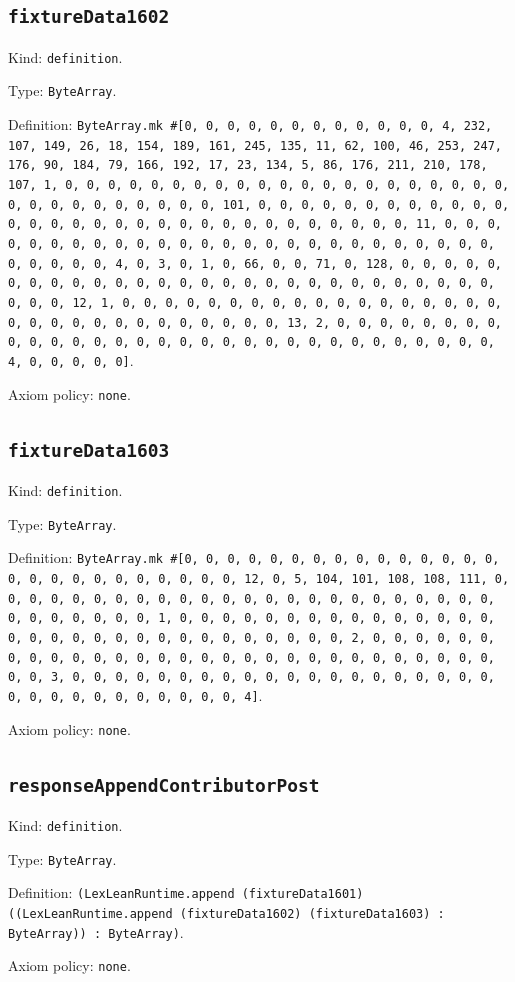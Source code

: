 \documentclass[11pt]{article}
\begin{document}
\subsection*{\texttt{fixtureData1602}}
\noindent Kind: \texttt{definition}.\par
\noindent Type: \texttt{ByteArray}.\par
\noindent Definition: \texttt{ByteArray.mk \#[0, 0, 0, 0, 0, 0, 0, 0, 0, 0, 0, 0, 4, 232, 107, 149, 26, 18, 154, 189, 161, 245, 135, 11, 62, 100, 46, 253, 247, 176, 90, 184, 79, 166, 192, 17, 23, 134, 5, 86, 176, 211, 210, 178, 107, 1, 0, 0, 0, 0, 0, 0, 0, 0, 0, 0, 0, 0, 0, 0, 0, 0, 0, 0, 0, 0, 0, 0, 0, 0, 0, 0, 0, 0, 0, 0, 0, 101, 0, 0, 0, 0, 0, 0, 0, 0, 0, 0, 0, 0, 0, 0, 0, 0, 0, 0, 0, 0, 0, 0, 0, 0, 0, 0, 0, 0, 0, 0, 0, 11, 0, 0, 0, 0, 0, 0, 0, 0, 0, 0, 0, 0, 0, 0, 0, 0, 0, 0, 0, 0, 0, 0, 0, 0, 0, 0, 0, 0, 0, 0, 0, 4, 0, 3, 0, 1, 0, 66, 0, 0, 71, 0, 128, 0, 0, 0, 0, 0, 0, 0, 0, 0, 0, 0, 0, 0, 0, 0, 0, 0, 0, 0, 0, 0, 0, 0, 0, 0, 0, 0, 0, 0, 0, 0, 12, 1, 0, 0, 0, 0, 0, 0, 0, 0, 0, 0, 0, 0, 0, 0, 0, 0, 0, 0, 0, 0, 0, 0, 0, 0, 0, 0, 0, 0, 0, 0, 0, 13, 2, 0, 0, 0, 0, 0, 0, 0, 0, 0, 0, 0, 0, 0, 0, 0, 0, 0, 0, 0, 0, 0, 0, 0, 0, 0, 0, 0, 0, 0, 0, 0, 4, 0, 0, 0, 0, 0]}.\par
\noindent Axiom policy: \texttt{none}.\par
\subsection*{\texttt{fixtureData1603}}
\noindent Kind: \texttt{definition}.\par
\noindent Type: \texttt{ByteArray}.\par
\noindent Definition: \texttt{ByteArray.mk \#[0, 0, 0, 0, 0, 0, 0, 0, 0, 0, 0, 0, 0, 0, 0, 0, 0, 0, 0, 0, 0, 0, 0, 0, 0, 0, 12, 0, 5, 104, 101, 108, 108, 111, 0, 0, 0, 0, 0, 0, 0, 0, 0, 0, 0, 0, 0, 0, 0, 0, 0, 0, 0, 0, 0, 0, 0, 0, 0, 0, 0, 0, 0, 0, 0, 1, 0, 0, 0, 0, 0, 0, 0, 0, 0, 0, 0, 0, 0, 0, 0, 0, 0, 0, 0, 0, 0, 0, 0, 0, 0, 0, 0, 0, 0, 0, 0, 2, 0, 0, 0, 0, 0, 0, 0, 0, 0, 0, 0, 0, 0, 0, 0, 0, 0, 0, 0, 0, 0, 0, 0, 0, 0, 0, 0, 0, 0, 0, 0, 3, 0, 0, 0, 0, 0, 0, 0, 0, 0, 0, 0, 0, 0, 0, 0, 0, 0, 0, 0, 0, 0, 0, 0, 0, 0, 0, 0, 0, 0, 0, 0, 4]}.\par
\noindent Axiom policy: \texttt{none}.\par
\subsection*{\texttt{responseAppendContributorPost}}
\noindent Kind: \texttt{definition}.\par
\noindent Type: \texttt{ByteArray}.\par
\noindent Definition: \texttt{(LexLeanRuntime.append (fixtureData1601) ((LexLeanRuntime.append (fixtureData1602) (fixtureData1603) : ByteArray)) : ByteArray)}.\par
\noindent Axiom policy: \texttt{none}.\par
\end{document}
